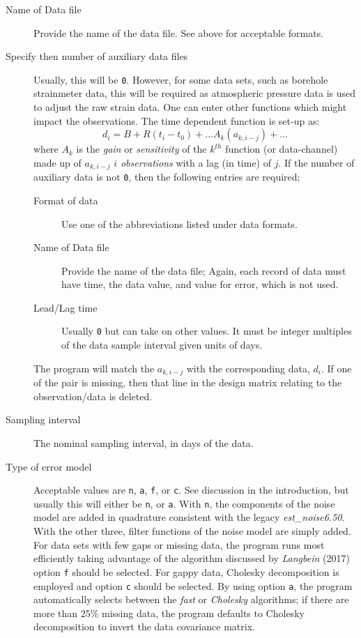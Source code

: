 \documentclass[12pt]{amsart}
\begin{document}
\begin{description}
\item[Name of Data file] Provide the name of the data file. See above for acceptable formats.

\item[Specify then number of auxiliary data files] Usually, this will be \texttt{0}.  However, for some data sets,
such as borehole strainmeter data, this will be required as atmospheric pressure data
is used to adjust the raw strain data. One can enter other functions which might impact the observations.  The time
dependent function is set-up as:
\begin{equation}
d_i  = B + R (t_i - t_0) + ...  A_k (a_{k,i-j}) + ...
\end{equation}
where $A_k$ is the \textit{gain} or \textit{sensitivity} of the $k^{th}$ function (or data-channel) made up of $a_{k,i-j}$
$i$ \textit{observations} with a lag (in time) of $j$.  If the number of auxiliary data is not \texttt{0}, then the following entries
are required;
\begin{description}
\item[Format of data] Use one of the abbreviations listed under data formats.
\item[Name of Data file] Provide the name of the data file; Again, each record of data must have time,
the data value, and value for error, which is not used.
\item[Lead/Lag time] Usually \texttt{0} but can take on other values. It must be integer multiples
of the data sample interval given units of days.
\end{description}
The program will match the $a_{k,i-j}$ with the corresponding data, $d_i$. If one of the pair is missing, then
that line in the design matrix relating to the observation/data is deleted.

\item[Sampling interval] The nominal sampling interval, in days of the data.

\item[Type of error model] Acceptable values are \texttt{n}, \texttt{a}, \texttt{f}, or \texttt{c}.  See discussion in
the introduction, but usually this will either be \texttt{n}, or \texttt{a}. With \texttt{n}, the components of the noise
model are added in quadrature consistent with the legacy \textit{est\_noise6.50}. With the other three, filter functions of the noise model are simply added.  For data sets with few gaps or missing data, the program runs most efficiently
taking advantage of the algorithm discussed by \textit{Langbein} (2017) option \texttt{f} should be selected.
For gappy data, Cholesky decomposition is employed and option \texttt{c} should be selected.  By using
option \texttt{a}, the program automatically selects between the \textit{fast} or \textit{Cholesky} algorithms;
if there are more than 25\% missing data, the program defaults to Cholesky decomposition to invert the data
covariance matrix.


\end{description}
\end{document}
